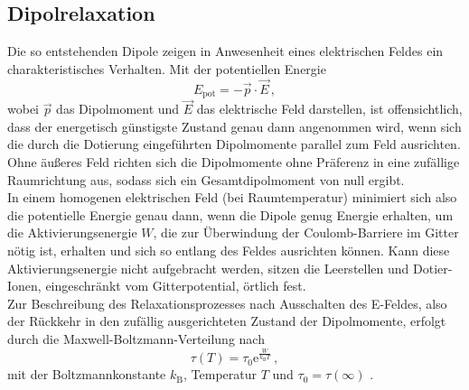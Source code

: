 \subsection{Dipolrelaxation}

Die so entstehenden Dipole zeigen in Anwesenheit eines elektrischen Feldes ein charakteristisches Verhalten.
Mit der potentiellen Energie
\begin{equation}
    E_\text{pot} = - \vec{p} \cdot \vec{E} \,,
    \label{eq:potE}
\end{equation}
wobei $\vec{p}$ das Dipolmoment und $\vec{E}$ das elektrische Feld darstellen, ist offensichtlich, dass der energetisch günstigste Zustand genau dann angenommen wird, 
wenn sich die durch die Dotierung eingeführten Dipolmomente parallel zum Feld ausrichten. \\

Ohne äußeres Feld richten sich die Dipolmomente ohne Präferenz in eine zufällige Raumrichtung aus, sodass sich ein Gesamtdipolmoment von null ergibt. \\
In einem homogenen elektrischen Feld (bei Raumtemperatur) minimiert sich also die potentielle Energie genau dann, wenn die Dipole genug Energie erhalten, um die Aktivierungsenergie $W$, 
die zur Überwindung der Coulomb-Barriere im Gitter nötig ist, erhalten und sich so entlang des Feldes ausrichten können.
Kann diese Aktivierungsenergie nicht aufgebracht werden, sitzen die Leerstellen und Dotier-Ionen, eingeschränkt vom Gitterpotential, örtlich fest. \\
Zur Beschreibung des Relaxationsprozesses nach Ausschalten des E-Feldes, also der Rückkehr in den zufällig ausgerichteten Zustand der Dipolmomente, erfolgt durch die Maxwell-Boltzmann-Verteilung nach
\begin{equation}
    \tau(T) = \tau_0 \text{e}^{\frac{W}{k_\text{B} T}}  \,,
\end{equation}
mit der Boltzmannkonstante $k_\text{B}$, Temperatur $T$ und $\tau_0 = \tau(\infty)$ \cite{v48}.





